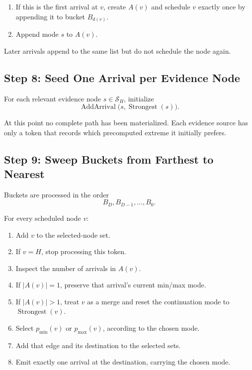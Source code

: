 \documentclass[11pt]{article}
\newcommand{\Strongest}{\operatorname{Strongest}}
\begin{document}
\begin{enumerate}
    \item If this is the first arrival at \(v\), create \(A(v)\) and schedule
          \(v\) exactly once by appending it to bucket \(B_{d(v)}\).
    \item Append mode \(s\) to \(A(v)\).
\end{enumerate}

Later arrivals append to the same list but do not schedule the node again.

\subsection{Step 8: Seed One Arrival per Evidence Node}

For each relevant evidence node \(s\in\mathcal{S}_H\), initialize
\[
    \operatorname{AddArrival}\bigl(s,\Strongest(s)\bigr).
\]

At this point no complete path has been materialized.  Each evidence source has
only a token that records which precomputed extreme it initially prefers.

\subsection{Step 9: Sweep Buckets from Farthest to Nearest}

Buckets are processed in the order
\[
    B_D,B_{D-1},\ldots,B_0.
\]

For every scheduled node \(v\):

\begin{enumerate}
    \item Add \(v\) to the selected-node set.
    \item If \(v=H\), stop processing this token.
    \item Inspect the number of arrivals in \(A(v)\).
    \item If \(|A(v)|=1\), preserve that arrival's current min/max mode.
    \item If \(|A(v)|>1\), treat \(v\) as a merge and reset the continuation
          mode to \(\Strongest(v)\).
    \item Select \(p_{\min}(v)\) or \(p_{\max}(v)\), according to the chosen
          mode.
    \item Add that edge and its destination to the selected sets.
    \item Emit exactly one arrival at the destination, carrying the chosen
          mode.
\end{enumerate}
\end{document}
